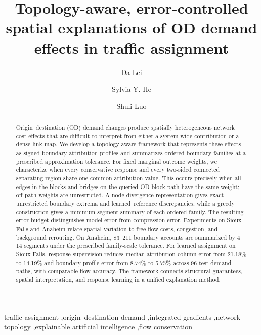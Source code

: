 \documentclass[a4paper,fleqn]{cas-sc}
\begin{document}
\title[mode=title]{Topology-aware, error-controlled spatial explanations of OD demand effects in traffic assignment}
\author[1]{Da Lei}
\author[2]{Sylvia Y. He}
\cormark[1]
\author[3]{Shuli Luo}
\begin{abstract}
Origin--destination (OD) demand changes produce spatially heterogeneous network cost effects that are difficult to interpret from either a system-wide contribution or a dense link map. We develop a topology-aware framework that represents these effects as signed boundary-attribution profiles and summarizes ordered boundary families at a prescribed approximation tolerance. For fixed marginal outcome weights, we characterize when every conservative response and every two-sided connected separating region share one common attribution value. This occurs precisely when all edges in the blocks and bridges on the queried OD block path have the same weight; off-path weights are unrestricted. A node-divergence representation gives exact unrestricted boundary extrema and learned--reference discrepancies, while a greedy construction gives a minimum-segment summary of each ordered family. The resulting error budget distinguishes model error from compression error. Experiments on Sioux Falls and Anaheim relate spatial variation to free-flow costs, congestion, and background rerouting. On Anaheim, 83--211 boundary accounts are summarized by 4--14 segments under the prescribed family-scale tolerance. For learned assignment on Sioux Falls, response supervision reduces median attribution-column error from 21.18\% to 14.19\% and boundary-profile error from 8.74\% to 5.75\% across 96 test demand paths, with comparable flow accuracy. The framework connects structural guarantees, spatial interpretation, and response learning in a unified explanation method.
\end{abstract}
\begin{keywords}
traffic assignment \sep origin--destination demand \sep integrated gradients \sep network topology \sep explainable artificial intelligence \sep flow conservation
\end{keywords}
\maketitle
{}
\end{document}
